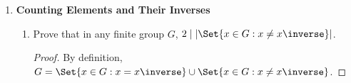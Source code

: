 \begin{enumerate}[label={\Alph*.},font={\bfseries}]
\begin{enumerate}[label={\arabic*},font={\bfseries}]
\begin{align*}
      \\
      ab &= c \\
      b^{-1}a^{-1} &= c^{-1} \\
      ba^{-1} &= c \\
      ba^{-1}a &= ca \\
      ca &= b
    \end{align*}
  \item Let $abc = (abc)^{-1}$, show that $bca = (bca)^{-1}$ and $cab = (cab)^{-1}$.
    \begin{align*}
      abc &= (abc)^{-1} \\
      bca &= a^{-1}(abc)^{-1}a \\
      &= a^{-1}(bc)^{-1} \\
      &= (bca)^{-1} \\
      \\
      bca &= (bca)^{-1} \\
      cab &= b^{-1}(bca)^{-1}b \\
      &= b^{-1}(ca)^{-1} \\
      &= (cab)^{-1}
    \end{align*}
  \item Let $a = a^{-1}$ and $b = b^{-1}$, show that $(ab)^{-1} = ba$.
    \begin{proof}
      Replace $a$ and $b$ with their inverses on the right-hand side of
      $(ab)^{-1} = b^{-1}a^{-1}$ to obtain $(ab)^{-1} = ba$.
    \end{proof}
  \item $a = a^{-1} \iff a^2 = e$
    \begin{proof}
      If $a = a^{-1}$, then $a^2 = e$ by multiplying by $a$ on the right.
      If $a^2 = e$, then $a = a^{-1}$ by multiplying by $a^{-1}$ on the right.
    \end{proof}
  \item Let $c = c^{-1}$. Prove $ab = c \iff abc = e$.
    \begin{proof}
      If $ab = c$, then $ab = c^{-1}$, since $c = c^{-1}$.
      Multiply by $c$ on the right to obtain $abc = e$.
      If $abc = e$, then $abc^{-1} = e$ since $c = c^{-1}$.
      Multiply by $c$ on the right to obtain $ab = c$.
    \end{proof}
  \end{enumerate}
\item {\bf Counting Elements and Their Inverses}
  \begin{enumerate}[label={\arabic*},font={\bfseries}]
  \item Prove that in any finite group $G$, $2 \mid \left|\Set{x \in G : x \ne x\inverse}\right|$.
    \begin{proof}
      By definition, $G = \Set{x \in G : x = x\inverse} \cup \Set{x \in G : x \ne x\inverse}$.


\end{proof}
\end{enumerate}
\end{enumerate}
